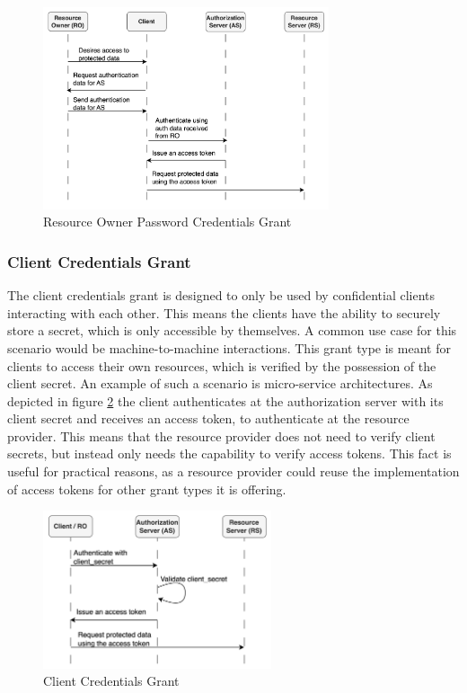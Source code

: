 \begin{figure}[H]
	\sffamily\footnotesize
	\includegraphics[width=0.75\textwidth]{pic/resource_owner_password_credentials_grant.png}
	\unitlength=0.75mm
	\linethickness{0.4pt}
	\caption{Resource Owner Password Credentials Grant}
	\label{fig:resource_owner_password_credentials_grant}
\end{figure}
	

\subsubsection{Client Credentials Grant}
The client credentials grant is designed to only be used by confidential clients interacting with each other. This means the clients have the ability to securely store a secret, which is only accessible by themselves. A common use case for this scenario would be machine-to-machine interactions. This grant type is meant for clients to access their own resources, which is verified by the possession of the client secret. An example of such a scenario is micro-service architectures. As depicted in figure \ref{fig:client_credentials_grant} the client authenticates at the authorization server with its client secret and receives an access token, to authenticate at the resource provider. This means that the resource provider does not need to verify client secrets, but instead only needs the capability to verify access tokens. This fact is useful for practical reasons, as a resource provider could reuse the implementation of access tokens for other grant types it is offering. \cite{hardt2012rfc}

\begin{figure}[H]
	\sffamily\footnotesize
	\includegraphics[width=0.6\textwidth]{pic/client_credentials_grant.png}
	\unitlength=0.75mm
	\linethickness{0.4pt}
	\caption{Client Credentials Grant}
	\label{fig:client_credentials_grant}
\end{figure}

